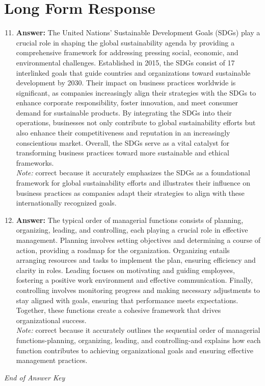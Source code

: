 \documentclass[12pt]{article}
\begin{document}
\section*{Long Form Response}
\begin{enumerate}[label=\arabic*.]
\setcounter{enumi}{10}
\item \textbf{Answer:} The United Nations' Sustainable Development Goals (SDGs) play a crucial role in shaping the global sustainability agenda by providing a comprehensive framework for addressing pressing social, economic, and environmental challenges. Established in 2015, the SDGs consist of 17 interlinked goals that guide countries and organizations toward sustainable development by 2030. Their impact on business practices worldwide is significant, as companies increasingly align their strategies with the SDGs to enhance corporate responsibility, foster innovation, and meet consumer demand for sustainable products. By integrating the SDGs into their operations, businesses not only contribute to global sustainability efforts but also enhance their competitiveness and reputation in an increasingly conscientious market. Overall, the SDGs serve as a vital catalyst for transforming business practices toward more sustainable and ethical frameworks.
\\ \textit{Note:} correct because it accurately emphasizes the SDGs as a foundational framework for global sustainability efforts and illustrates their influence on business practices as companies adapt their strategies to align with these internationally recognized goals.
\item \textbf{Answer:} The typical order of managerial functions consists of planning, organizing, leading, and controlling, each playing a crucial role in effective management. Planning involves setting objectives and determining a course of action, providing a roadmap for the organization. Organizing entails arranging resources and tasks to implement the plan, ensuring efficiency and clarity in roles. Leading focuses on motivating and guiding employees, fostering a positive work environment and effective communication. Finally, controlling involves monitoring progress and making necessary adjustments to stay aligned with goals, ensuring that performance meets expectations. Together, these functions create a cohesive framework that drives organizational success.
\\ \textit{Note:} correct because it accurately outlines the sequential order of managerial functions-planning, organizing, leading, and controlling-and explains how each function contributes to achieving organizational goals and ensuring effective management practices.
\end{enumerate}

\vfill
\noindent\textit{End of Answer Key}
\end{document}
